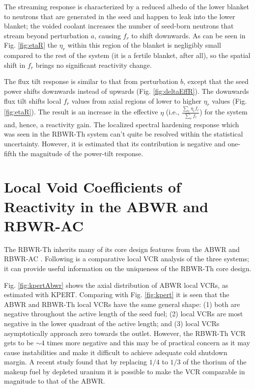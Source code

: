 \documentclass[11pt]{article}
\newcommand{\tild}[0]{\sim\!\!}
\begin{document}
The streaming response is characterized by a reduced albedo of the lower blanket to neutrons that are generated in the seed and happen to leak into the lower blanket; the voided coolant increases the number of seed-born neutrons that stream beyond perturbation $a$, causing $f_r$ to shift downwards.
As can be seen in Fig. \ref{fig:etaR} the $\eta_r$ within this region of the blanket is negligibly small compared to the rest of the system (it is a fertile blanket, after all), so the spatial shift in $f_r$ brings no significant reactivity change.

The flux tilt response is similar to that from perturbation $b$, except that the seed power shifts downwards instead of upwards (Fig. \ref{fig:deltaEffR}).
The downwards flux tilt shifts local $f_r$ values from axial regions of lower to higher $\eta_r$ values (Fig. \ref{fig:etaR}).
The result is an increase in the effective $\eta$ (i.e., $\frac{\sum_r{\eta_r f_r}}{\sum_r{f_r}}$) for the system and, hence, a reactivity gain.
The localized spectral hardening response which was seen in the RBWR-Th system can't quite be resolved within the statistical uncertainty.
However, it is estimated that its contribution is negative and one-fifth the magnitude of the power-tilt response.

\section{Local Void Coefficients of Reactivity in the ABWR and RBWR-AC}
\label{sec:other}

The RBWR-Th inherits many of its core design features from the ABWR \cite{fennern2007asr} and RBWR-AC \cite{takeda2007blt}.
Following is a comparative local VCR analysis of the three systems; it can provide useful information on the uniqueness of the RBWR-Th core design.

Fig. \ref{fig:kpertAbwr} shows the axial distribution of ABWR local VCRs, as estimated with KPERT.
Comparing with Fig. \ref{fig:kpert} it is seen that the ABWR and RBWR-Th local VCRs have the same general shape: (1) both are negative throughout the active length of the seed fuel; (2) local VCRs are most negative in the lower quadrant of the active length; and (3) local VCRs asymptotically approach zero towards the outlet.
However, the RBWR-Th VCR gets to be $\tild 4$ times more negative and this may be of practical concern as it may cause instabilities and make it difficult to achieve adequate cold shutdown margin.
A recent study found \cite{gorman2014tfr} that by replacing $1/4$ to $1/3$ of the thorium of the makeup fuel by depleted uranium it is possible to make the VCR comparable in magnitude to that of the ABWR.
\end{document}
